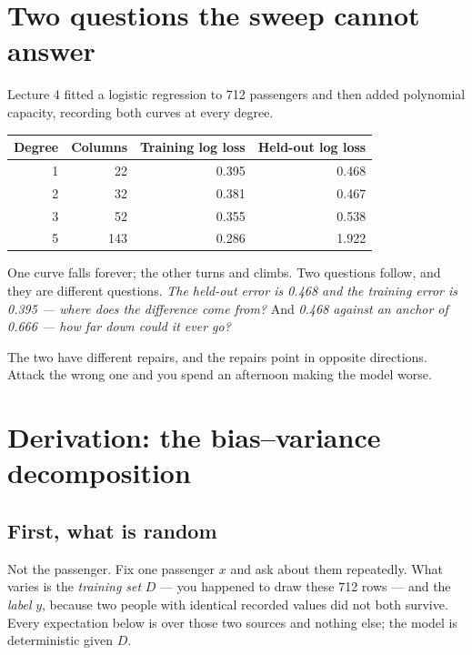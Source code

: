 \documentclass[11pt,a4paper]{article}
\begin{document}

\section{Two questions the sweep cannot answer}

Lecture 4 fitted a logistic regression to 712 passengers and then added
polynomial capacity, recording both curves at every degree.

\begin{center}
\small
\begin{tabular}{rrrr}
\toprule
\textbf{Degree} & \textbf{Columns} & \textbf{Training log loss} &
\textbf{Held-out log loss} \\
\midrule
1 &  22 & 0.395 & 0.468 \\
2 &  32 & 0.381 & 0.467 \\
3 &  52 & 0.355 & 0.538 \\
5 & 143 & 0.286 & 1.922 \\
\bottomrule
\end{tabular}
\end{center}

One curve falls forever; the other turns and climbs. Two questions follow, and
they are different questions. \emph{The held-out error is 0.468 and the
training error is 0.395 --- where does the difference come from?} And
\emph{0.468 against an anchor of 0.666 --- how far down could it ever go?}

The two have different repairs, and the repairs point in opposite directions.
Attack the wrong one and you spend an afternoon making the model worse.

\section{Derivation: the bias--variance decomposition}

\subsection{First, what is random}

Not the passenger. Fix one passenger $x$ and ask about them repeatedly. What
varies is the \emph{training set} $D$ --- you happened to draw these 712 rows
--- and the \emph{label} $y$, because two people with identical recorded values
did not both survive. Every expectation below is over those two sources and
nothing else; the model is deterministic given $D$.
\end{document}
